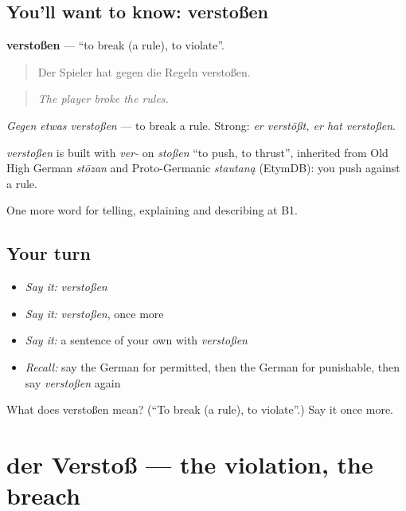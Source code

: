 \subsection*{You'll want to know: verstoßen}
\textbf{verstoßen} — \textquotedblleft{}to break (a rule), to violate\textquotedblright{}.

\begin{quote}
Der Spieler hat gegen die Regeln verstoßen.
\end{quote}

\begin{quote}
\emph{The player broke the rules.}
\end{quote}

\emph{Gegen etwas verstoßen} — to break a rule. Strong: \emph{er verstößt, er hat verstoßen}.

\begin{cousinweb}
\emph{verstoßen} is built with \emph{ver-} on \emph{stoßen} \textquotedblleft{}to push, to thrust\textquotedblright{}, inherited from Old High German \emph{stōzan} and Proto-Germanic \emph{stautaną} (EtymDB): you push against a rule.
\end{cousinweb}

\begin{grammarlens}[title={What you've built}]
One more word for telling, explaining and describing at B1.
\end{grammarlens}

\subsection*{Your turn}
\begin{itemize}
\raggedright
  \item \emph{Say it:} \emph{verstoßen}
  \item \emph{Say it:} \emph{verstoßen}, once more
  \item \emph{Say it:} a sentence of your own with \emph{verstoßen}
  \item \emph{Recall:} say the German for permitted, then the German for punishable, then say \emph{verstoßen} again
\end{itemize}

\begin{tcolorbox}[breakable,colback=teal!4,colframe=teal!35!black,title={Before you move on}]
What does verstoßen mean? (\textquotedblleft{}To break (a rule), to violate\textquotedblright{}.) Say it once more.
\end{tcolorbox}
\section[der Verstoß]{der Verstoß — the violation, the breach}

